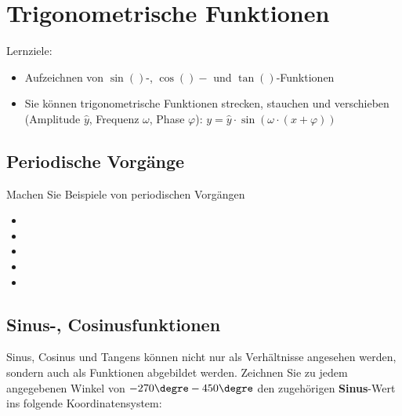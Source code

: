 
\section{Trigonometrische
  Funktionen}

Lernziele:
\begin{itemize}
\item Aufzeichnen von $\sin()$-, $\cos()-$ und $\tan()$-Funktionen
\item Sie können trigonometrische Funktionen strecken, stauchen und
  verschieben (Amplitude $\hat{y}$, Frequenz $\omega$, Phase
  $\varphi$): $y=\hat{y}\cdot{}\sin(\omega\cdot{}(x+\varphi))$
\end{itemize}


\subsection{Periodische Vorgänge}
Machen Sie Beispiele von periodischen Vorgängen
\begin{itemize}
  \item {}
  \item {}
  \item {}
  \item {}
  \item {}
\end{itemize}
\newpage

\subsection{Sinus-, Cosinusfunktionen}
Sinus, Cosinus und Tangens können nicht nur als Verhältnisse angesehen
werden, sondern auch als Funktionen abgebildet werden.
Zeichnen Sie zu jedem angegebenen Winkel von $-270\degre - 450\degre$ den zugehörigen
\textbf{Sinus}-Wert ins folgende Koordinatensystem:

\noTRAINER{\trigsysD}\TRAINER{\trigsysDsin}



